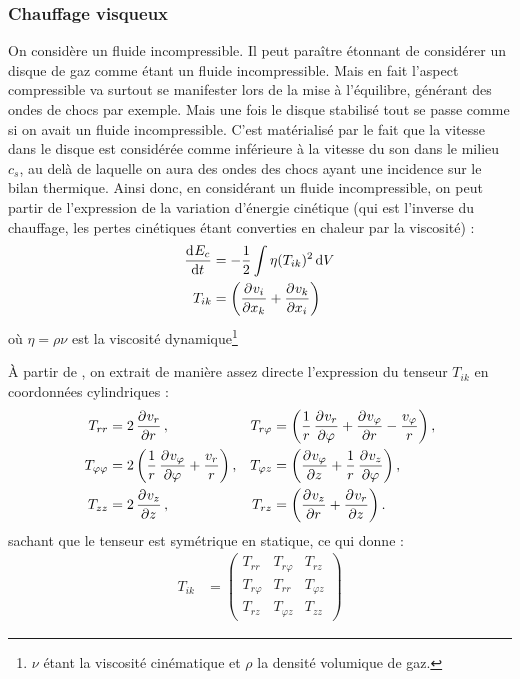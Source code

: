 
\subsubsection{Chauffage visqueux}
On considère un fluide incompressible. Il peut paraître étonnant de considérer un disque de gaz comme étant un fluide incompressible. Mais en fait l'aspect compressible va surtout se manifester lors de la mise à l'équilibre, générant des ondes de chocs par exemple. Mais une fois le disque stabilisé tout se passe comme si on avait un fluide incompressible. C'est matérialisé par le fait que la vitesse dans le disque est considérée comme inférieure à la vitesse du son dans le milieu $c_s$, au delà de laquelle on aura des ondes des chocs ayant une incidence sur le bilan thermique. Ainsi donc, en considérant un fluide incompressible, on peut partir de l'expression de la variation d'énergie cinétique (qui est l'inverse du chauffage, les pertes cinétiques étant converties en chaleur par la viscosité) \citep[(16.3)]{landau1989mecanique} : 
\begin{align}
\dod{E_c}{t} &= - \frac{1}{2}\int \eta(T_{ik})^2\dif V\\
T_{ik} &= \left(\dpd{v_i}{x_k} + \dpd{v_k}{x_i}\right)\nonumber
\end{align}
où $\eta = \rho\nu$ est la viscosité dynamique\footnote{$\nu$ étant la viscosité cinématique et $\rho$ la densité volumique de gaz.}

À partir de \citep[(15.8) et (15.17)]{landau1989mecanique}, on extrait de manière assez directe l'expression du tenseur $T_{ik}$ en coordonnées cylindriques : 
\begin{align}
T_{rr} &= 2\dpd{v_r}{r}, & T_{r\varphi} &= \left(\inv{r} \dpd{v_r}{\varphi} + \dpd{v_\varphi}{r} - \frac{v_\varphi}{r}\right),\nonumber\\
T_{\varphi\varphi} &= 2 \left(\inv{r} \dpd{v_\varphi}{\varphi} + \frac{v_r}{r}\right), & T_{\varphi z} &= \left(\dpd{v_\varphi}{z} + \inv{r}\dpd{v_z}{\varphi}\right),\\
T_{zz} &= 2\dpd{v_z}{z}, & T_{rz} &= \left(\dpd{v_z}{r} + \dpd{v_r}{z}\right).\nonumber
\end{align}
sachant que le tenseur est symétrique en statique, ce qui donne : 
\begin{align}
T_{ik} &= \begin{pmatrix}
T_{rr} & T_{r\varphi} & T_{rz}\\
T_{r\varphi} & T_{rr} & T_{\varphi z}\\
T_{rz} & T_{\varphi z} & T_{zz}
\end{pmatrix}
\end{align}

